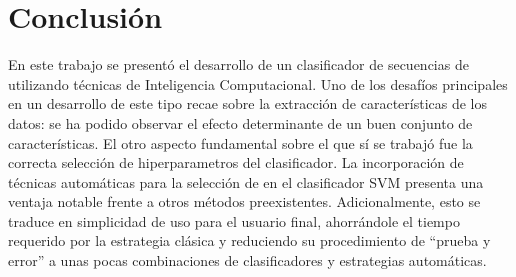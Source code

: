 %
%
%
%
\chapter{Conclusión}
%
En este trabajo se presentó el desarrollo de un clasificador de
secuencias de  utilizando técnicas de Inteligencia
Computacional.
Uno de los desafíos principales en un desarrollo de este tipo recae
sobre la extracción de características de los datos: se ha podido
observar el efecto determinante de un buen conjunto de
características.
El otro aspecto fundamental sobre el que sí se trabajó fue la correcta
selección de hiperparametros del clasificador.
La incorporación de técnicas automáticas para la selección de
 en el clasificador SVM presenta una ventaja notable frente
a otros métodos preexistentes.
Adicionalmente, esto se traduce en simplicidad de uso para el usuario
final, ahorrándole el tiempo requerido por la estrategia clásica y
reduciendo su procedimiento de ``prueba y error'' a unas pocas
combinaciones de clasificadores y estrategias automáticas.
